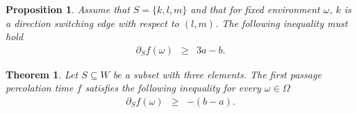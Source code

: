 \documentclass[10pt,a4paper]{amsart}
\newtheorem{proposition}{Proposition}
\newtheorem{theorem}{Theorem}
\begin{document}
\begin{proposition}\label{thm|lowerBoundS3DSwitch} 
Assume that $S=\{k,l,m\}$ and that for fixed environment $\omega$, $k$ is a direction switching edge with respect to 
$(l,m)$.
The following inequality must hold
\begin{eqnarray} 
\partial_Sf(\omega)&\geq&3a-b.\label{eqn|BoundS3DirectionSwitch}
\end{eqnarray}
\end{proposition}

\begin{theorem}\label{thm|lowerBoundS3}
Let $S\subseteq W$ be a subset with three elements. The first passage percolation time $f$ satisfies the following inequality for every $\omega\in\Omega$
\begin{eqnarray}
\partial_Sf(\omega)&\geq& -(b-a). \label{eqn|lowerBoundS3}
\end{eqnarray}
\end{theorem}
\end{document}
